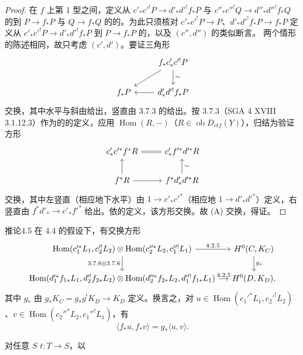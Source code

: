 \begin{proof}
在 $f$ 上第 1 型之间，定义从 $c'_*c'^!P\to d'_*d'^!f_*P$ 与 $c''_*c''^!Q\to d''_*d''^!f_*Q$ 的到 $P\to f_*P$ 与 $Q\to f_*Q$ 的的。为此只须核对 $c'_*c'^!P\to P$、$d'_*d'^!f_*P\to f_*P$ 定义从 $c'_*c'^!P\to d'_*d'^!f_*P$ 到 $P\to f_*P$ 的，以及 $(c'',d'')$ 的类似断言。
两个情形的陈述相同，故只考虑 $(c',d')$。要证三角形
\[\begin{tikzcd}&f_*c'_*c'^!P\arrow[dl]\arrow[d,"\sim"]\\ f_*P&d'_*d'^!f_*P\arrow[l]\end{tikzcd}\]
交换，其中水平与斜由给出，竖直由 3.7.3 的给出。按 3.7.3（SGA 4 XVIII 3.1.12.3）作为的的定义，应用 $\operatorname{Hom}(R,-)$（$R\in\operatorname{ob}D_{ctf}(Y)$），归结为验证方形
\[\begin{tikzcd}
c'_*c'^*f^*R\arrow[r,equal]&c'_*f'^*d'^*R\\ f^*R\arrow[u]\arrow[r]&f^*d'_*d'^*R\arrow[u,"\sim"']
\end{tikzcd}\]
交换，其中左竖直（相应地下水平）由 $1\to c'_*c'^*$（相应地 $1\to d'_*d'^*$）定义，右竖直由 $f^*d'_*\to c'_*f'^*$ 给出。依的定义，该方形交换。故 (A) 交换，得证。
\end{proof}
\begin{SGAresult}{推论}{4.5}
在 4.4 的假设下，有交换方形
\[\begin{tikzcd}[column sep=small]
\operatorname{Hom}(c_1'^*L_1,c_2'^!L_2)\otimes\operatorname{Hom}(c_2''^*L_2,c_1''^!L_1)\arrow[r,"4.2.5"]\arrow[d,"{3.7.6\otimes3.7.6}"']&H^0(C,K_C)\arrow[d,"g_*"]\\
\operatorname{Hom}(d_1'^*f_{1*}L_1,d_2'^!f_{2*}L_2)\otimes\operatorname{Hom}(d_2''^*f_{2*}L_2,d_1''^!f_{1*}L_1)\arrow[r,"4.2.5"]&H^0(D,K_D),
\end{tikzcd}\]
其中 $g_*$ 由 $g_*K_C=g_*g^!K_D\to K_D$ 定义。换言之，对 $u\in\operatorname{Hom}(c_1'^*L_1,c_2'^!L_2)$、$v\in\operatorname{Hom}(c_2''^*L_2,c_1''^!L_1)$，有
\[\langle f_*u,f_*v\rangle=g_*\langle u,v\rangle.\tag{4.5.1}\]
\end{SGAresult}
对任意 $S$  $t:T\to S$，以
